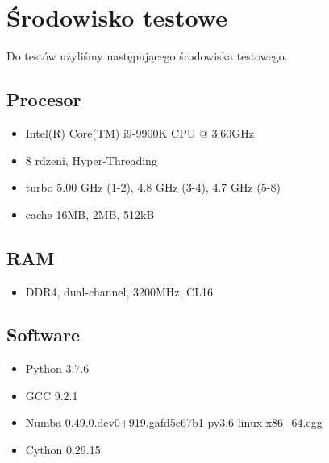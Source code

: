\section{Środowisko testowe}

Do testów użyliśmy następującego środowiska testowego.

\subsection{Procesor}

\begin{itemize}
    \item Intel(R) Core(TM) i9-9900K CPU @ 3.60GHz
    \item 8 rdzeni, Hyper-Threading
    \item turbo 5.00 GHz (1-2), 4.8 GHz (3-4), 4.7 GHz (5-8)
    \item cache 16MB, 2MB, 512kB
\end{itemize}

\subsection{RAM}

\begin{itemize}
    \item DDR4, dual-channel, 3200MHz, CL16
\end{itemize}

\subsection{Software}

\begin{itemize}
    \item Python 3.7.6
    \item GCC 9.2.1
    \item Numba 0.49.0.dev0+919.gafd5c67b1-py3.6-linux-x86\_64.egg
    \item Cython 0.29.15
\end{itemize}
